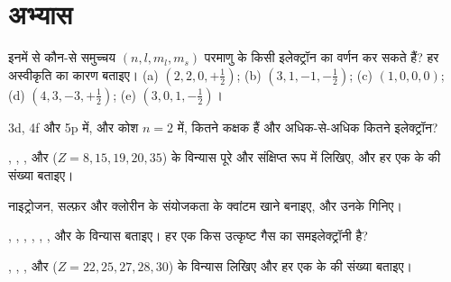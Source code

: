 \section{अभ्यास}

\begin{exercise}[$\star$]\label{exo:b1:quantum-numbers:1}
इनमें से कौन-से समुच्चय $(n, l, m_l, m_s)$ परमाणु के किसी इलेक्ट्रॉन का
वर्णन कर सकते हैं? हर अस्वीकृति का कारण बताइए।
(a) $(2, 2, 0, +\tfrac12)$; (b) $(3, 1, -1, -\tfrac12)$;
(c) $(1, 0, 0, 0)$; (d) $(4, 3, -3, +\tfrac12)$; (e) $(3, 0, 1, -\tfrac12)$।
\end{exercise}

\begin{exercise}[$\star$]\label{exo:b1:quantum-numbers:2}
 3d, 4f और 5p में, और कोश $n = 2$ में, कितने कक्षक हैं और
अधिक-से-अधिक कितने इलेक्ट्रॉन?
\end{exercise}

\begin{exercise}[$\star$]\label{exo:b1:quantum-numbers:3}
, , , 
और  ($Z = 8, 15, 19, 20, 35$) के  विन्यास पूरे और संक्षिप्त रूप में
लिखिए, और हर एक के  की संख्या बताइए।
\end{exercise}

\begin{exercise}[$\star$]\label{exo:b1:quantum-numbers:4}
नाइट्रोजन, सल्फ़र और क्लोरीन के संयोजकता  के क्वांटम खाने बनाइए, और
उनके  गिनिए।
\end{exercise}

\begin{exercise}[$\star\star$]\label{exo:b1:quantum-numbers:5}
, , , ,
, ,  और  के विन्यास बताइए। हर एक
किस उत्कृष्ट गैस का समइलेक्ट्रॉनी है?
\end{exercise}

\begin{exercise}[$\star\star$]\label{exo:b1:quantum-numbers:6}
, , ,
 और  ($Z = 22, 25, 27, 28, 30$) के विन्यास लिखिए और
हर एक के  की संख्या बताइए।
\end{exercise}

